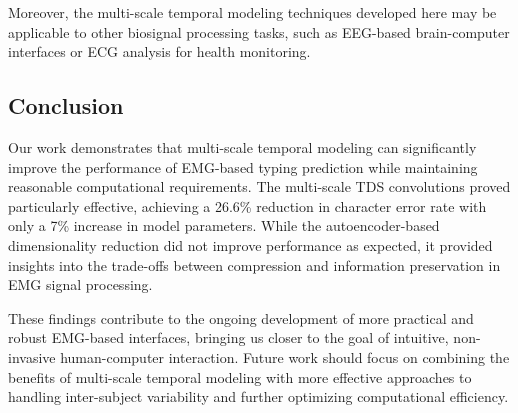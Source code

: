 Moreover, the multi-scale temporal modeling techniques developed here may be applicable to other biosignal processing tasks, such as EEG-based brain-computer interfaces or ECG analysis for health monitoring.

\subsection{Conclusion}

Our work demonstrates that multi-scale temporal modeling can significantly improve the performance of EMG-based typing prediction while maintaining reasonable computational requirements. The multi-scale TDS convolutions proved particularly effective, achieving a 26.6\% reduction in character error rate with only a 7\% increase in model parameters. While the autoencoder-based dimensionality reduction did not improve performance as expected, it provided insights into the trade-offs between compression and information preservation in EMG signal processing.

These findings contribute to the ongoing development of more practical and robust EMG-based interfaces, bringing us closer to the goal of intuitive, non-invasive human-computer interaction. Future work should focus on combining the benefits of multi-scale temporal modeling with more effective approaches to handling inter-subject variability and further optimizing computational efficiency.